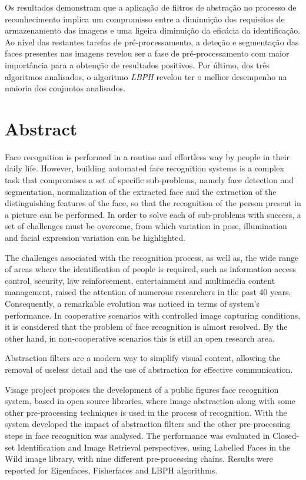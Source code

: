 Os resultados demonstram que a aplicação de filtros de abstração no processo de reconhecimento implica um compromisso entre a diminuição dos requisitos de armazenamento das imagens e uma ligeira diminuição da eficácia da identificação. Ao nível das restantes tarefas de pré-processamento, a deteção e segmentação das faces presentes nas imagens revelou ser a fase de pré-processamento com maior importância para a obtenção de resultados positivos. Por último, dos três algoritmos analisados, o algoritmo \textit{LBPH} revelou ter o melhor desempenho na maioria dos conjuntos analisados.

\chapter*{Abstract}
Face recognition is performed in a routine and effortless way by people in their daily life. However, building automated face recognition systems is a complex task that compromises a set of specific sub-problems, namely face detection and segmentation, normalization of the extracted face and the extraction of the distinguishing features of the face, so that the recognition of the person present in a picture can be performed. In order to solve each of sub-problems with success, a set of challenges must be overcome, from which variation in pose, illumination and facial expression variation can be highlighted.

The challenges associated with the recognition process, as well as, the wide range of areas where the identification of people is required, such as information access control, security, law reinforcement, entertainment and multimedia content management, raised the attention of numerous researchers in the past 40 years. Consequently, a remarkable evolution was noticed in terms of system's performance. In cooperative scenarios with controlled image capturing conditions, it is considered that the problem of face recognition is almost resolved. By the other hand,  in non-cooperative scenarios this is still an open research area.

Abstraction filters are a modern way to simplify visual content, allowing the removal of useless detail and the use of abstraction for effective communication.

Visage project proposes the development of a public figures face recognition system, based in open source libraries, where image abstraction along with some other pre-processing techniques is used in the process of recognition. With the system developed the impact of abstraction filters and the other pre-processing steps in face recognition was analysed. The performance was evaluated in Closed-set Identification and Image Retrieval perspectives, using Labelled Faces in the Wild image library, with nine different pre-processing chains. Results were reported for Eigenfaces, Fisherfaces and LBPH algorithms.


